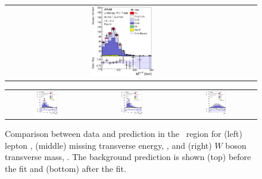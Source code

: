 \begin{figure}[tp]
\begin{tabular}{ccc}
  \includegraphics[width=0.27\textwidth]{Analysis/Figures_ttH/tesis_vars/postfit/WlepMT_6jetin4btagin.eps} \\
\end{tabular}
\caption{Comparison between data and prediction in the \sixfour\ region for (left) lepton \pt,  (middle) missing transverse energy, \met, and (right)  $W$ boson transverse mass, \mtw. The background prediction is shown (top) before the fit and (bottom) after the fit.}
  \label{fig:vars1_sixfour}
\vspace{0.5cm}
  \centering
  \begin{tabular}{ccc}
  \includegraphics[width=0.27\textwidth]{Analysis/Figures_ttH/tesis_vars/prefit/jet1_pt_6jetin4btagin.eps} &
  \includegraphics[width=0.27\textwidth]{Analysis/Figures_ttH/tesis_vars/prefit/bjet1_pt_6jetin4btagin.eps} &
  \includegraphics[width=0.27\textwidth]{Analysis/Figures_ttH/tesis_vars/prefit/lep_eta_6jetin4btagin.eps} \\

\end{tabular}
\end{figure}
